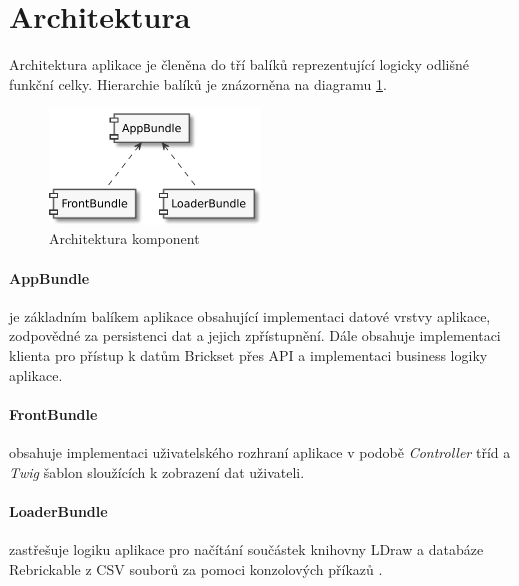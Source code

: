 \section{Architektura}
Architektura aplikace je členěna do tří balíků reprezentující logicky odlišné funkční celky. Hierarchie balíků je znázorněna na diagramu \ref{diagram-bundles}.

\begin{figure}[htbp]
    \centering
    \includegraphics[width=0.5\textwidth,height=\textheight,keepaspectratio]{pdfs/bundles}
    \caption{Architektura komponent\label{diagram-bundles}}
\end{figure}

\paragraph{AppBundle}  
je základním balíkem aplikace obsahující implementaci datové vrstvy aplikace, zodpovědné za persistenci dat a jejich zpřístupnění. Dále obsahuje implementaci klienta pro přístup k datům Brickset přes API a implementaci business logiky aplikace.

\paragraph{FrontBundle} 
obsahuje implementaci uživatelského rozhraní aplikace v podobě \textit{Controller} tříd a \textit{Twig} šablon sloužících k zobrazení dat uživateli.

\paragraph{LoaderBundle} 
zastřešuje logiku aplikace pro načítání součástek knihovny LDraw a databáze Rebrickable z \gls{CSV} souborů za pomoci konzolových příkazů \autocite{symfony:console}. 

